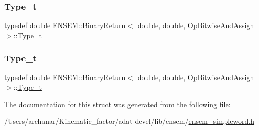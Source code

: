 \mbox{\label{structENSEM_1_1BinaryReturn_3_01double_00_01double_00_01OpBitwiseAndAssign_01_4_aa3e34db7c5a718f74845bd8e24088ed0}} 
\subsubsection{\texorpdfstring{Type\_t}{Type\_t}\hspace{0.1cm}{\footnotesize\ttfamily [2/3]}}
{\footnotesize\ttfamily typedef double \mbox{\hyperlink{structENSEM_1_1BinaryReturn}{E\+N\+S\+E\+M\+::\+Binary\+Return}}$<$ double, double, \mbox{\hyperlink{structENSEM_1_1OpBitwiseAndAssign}{Op\+Bitwise\+And\+Assign}} $>$\+::\mbox{\hyperlink{structENSEM_1_1BinaryReturn_3_01double_00_01double_00_01OpBitwiseAndAssign_01_4_aa3e34db7c5a718f74845bd8e24088ed0}{Type\+\_\+t}}}

\mbox{\label{structENSEM_1_1BinaryReturn_3_01double_00_01double_00_01OpBitwiseAndAssign_01_4_aa3e34db7c5a718f74845bd8e24088ed0}} 
\subsubsection{\texorpdfstring{Type\_t}{Type\_t}\hspace{0.1cm}{\footnotesize\ttfamily [3/3]}}
{\footnotesize\ttfamily typedef double \mbox{\hyperlink{structENSEM_1_1BinaryReturn}{E\+N\+S\+E\+M\+::\+Binary\+Return}}$<$ double, double, \mbox{\hyperlink{structENSEM_1_1OpBitwiseAndAssign}{Op\+Bitwise\+And\+Assign}} $>$\+::\mbox{\hyperlink{structENSEM_1_1BinaryReturn_3_01double_00_01double_00_01OpBitwiseAndAssign_01_4_aa3e34db7c5a718f74845bd8e24088ed0}{Type\+\_\+t}}}



The documentation for this struct was generated from the following file\+:\begin{DoxyCompactItemize}
\item 
/\+Users/archanar/\+Kinematic\+\_\+factor/adat-\/devel/lib/ensem/\mbox{\hyperlink{adat-devel_2lib_2ensem_2ensem__simpleword_8h}{ensem\+\_\+simpleword.\+h}}\end{DoxyCompactItemize}
